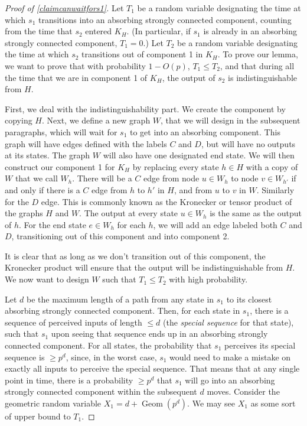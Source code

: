 \documentclass[12pt]{article}
\theoremstyle{definition}
\theoremstyle{remark}
\begin{document}
      \begin{proof}[Proof of \cref{claimcanwaitfors1}]

        Let $T_1$ be a random variable designating the time at which $s_1$ transitions into an absorbing strongly connected component, counting from the time that $s_2$ entered $K_H$. (In particular, if $s_1$ is already in an absorbing strongly connected component, $T_1 = 0$.)
        Let $T_2$ be a random variable designating the time at which $s_2$ transitions out of component 1 in $K_H$.
        To prove our lemma, we want to prove that with probability $1 - O(p)$, $T_1 \leq T_2$, and that during all the time that we are in component 1 of $K_H$, the output of $s_2$ is indistinguishable from $H$.

        First, we deal with the indistinguishability part. We create the component by copying $H$. Next, we define a new graph $W$, that we will design in the subsequent paragraphs, which will wait for $s_1$ to get into an absorbing component. This graph will have edges defined with the labels $C$ and $D$, but will have no outputs at its states. The graph $W$ will also have one designated end state. We will then construct our component 1 for $K_H$ by replacing every state $h \in H$ with a copy of $W$ that we call $W_h$. There will be a $C$ edge from node $u \in W_h$ to node $v \in W_{h'}$ if and only if there is a $C$ edge from $h$ to $h'$ in $H$, and from $u$ to $v$ in $W$. Similarly for the $D$ edge. This is commonly known as the Kronecker or tensor product of the graphs $H$ and $W$. The output at every state $u \in W_h$ is the same as the output of $h$. For the end state $e \in W_h$ for each $h$, we will add an edge labeled both $C$ and $D$, transitioning out of this component and into component 2.

        It is clear that as long as we don't transition out of this component, the Kronecker product will ensure that the output will be indistinguishable from $H$. We now want to design $W$ such that $T_1 \leq T_2$ with high probability.
        
        Let $d$ be the maximum length of a path from any state in $s_1$ to its closest absorbing strongly connected component. Then, for each state in $s_1$, there is a sequence of perceived inputs of length $\leq d$ (the \textit{special sequence} for that state), such that $s_1$ upon seeing that sequence ends up in an absorbing strongly connected component. For all states, the probability that $s_1$ 
        perceives its special sequence is $\geq p^d$, since, in the worst case, $s_1$ would need to make a mistake on exactly all 
        inputs to perceive the special sequence. That means that at any single point in time, there is a probability $\geq p^d$ that $s_1$ 
        will go into an absorbing strongly connected component within the subsequent $d$ moves. Consider the geometric random variable $X_1 = d + \operatorname{Geom} (p^d)$. We may see $X_1$ as some sort of upper bound to $T_1$.


\end{proof}
\end{document}
